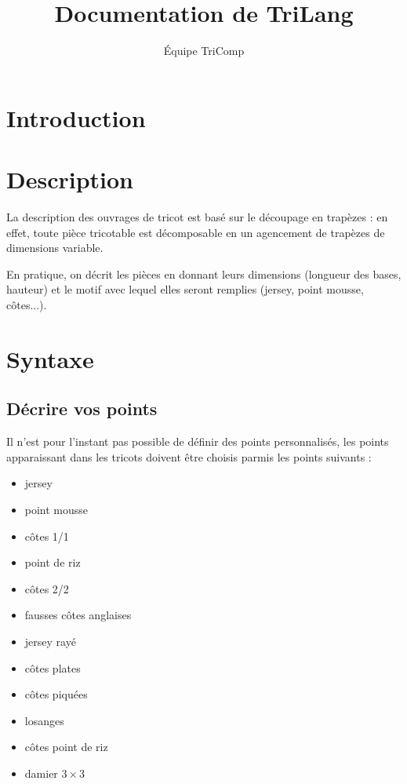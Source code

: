 \documentclass[a4paper,10pt]{article}
\title{Documentation de TriLang}
\author{Équipe TriComp}
\begin{document}
\maketitle

\begin{abstract}

\end{abstract}

\newpage

\tableofcontents

\newpage


\section{Introduction}

\section{Description}

La description des ouvrages de tricot est basé sur le découpage en trapèzes : en effet, toute pièce tricotable est décomposable en un agencement de trapèzes
de dimensions variable.

En pratique, on décrit les pièces en donnant leurs dimensions (longueur des bases, hauteur) et le motif avec lequel elles seront remplies (jersey, point mousse,
côtes...).

\section{Syntaxe}

  \subsection{Décrire vos points}


Il n'est pour l'instant pas possible de définir des points personnalisés, les points apparaissant dans les tricots doivent être choisis parmis les points suivants :
\begin{itemize}
\item jersey
\item point mousse
\item côtes 1/1
\item point de riz
\item côtes 2/2
\item fausses côtes anglaises
\item jersey rayé
\item côtes plates
\item côtes piquées
\item losanges
\item côtes point de riz
\item damier $3\times 3$
\end{itemize}
  
\end{document}
